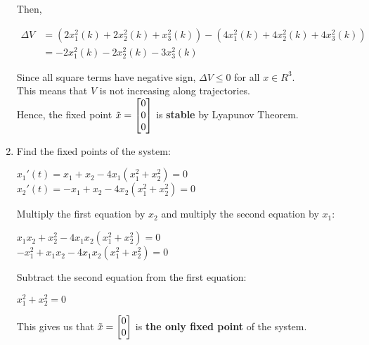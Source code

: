 \documentclass[12pt,a4paper, margin=1in]{article}
\begin{document}
\begin{enumerate}
        Then,

            \begin{center}
            \begin{equation*}
            \begin{split}
                    \Delta V & = (2x_1^2(k) + 2x_2^2(k) + x_3^2(k)) - (4x_1^2(k) + 4x_2^2(k) + 4x_3^2(k))\\
                    & = -2x_1^2(k) -2x_2^2(k) -3x_3^2(k)
            \end{split}
            \end{equation*}    
            \end{center}
        
            Since all square terms have negative sign, $\Delta V \leq 0$ for all $x \in R^3$.  \\

            This means that $V$ is not increasing along trajectories.  \\

            Hence, the fixed point $\Tilde{x} = \begin{bmatrix}
                0 \\ 0 \\ 0
            \end{bmatrix}$ is \textbf{stable} by Lyapunov Theorem. 

\newpage
    \item %
        Find the fixed points of the system: 
        \begin{center}
            $x_1'(t) = x_1 + x_2 -4x_1(x_1^2 + x_2^2) = 0$ \\
            $x_2'(t) = -x_1 + x_2 -4x_2(x_1^2 + x_2^2) = 0$ \\ 
        \end{center}
            Multiply the first equation by $x_2$ and multiply the second equation by $x_1$:
        \begin{center}
            $x_1x_2 + x_2^2 -4x_1x_2(x_1^2 + x_2^2) = 0$ \\
            $-x_1^2 + x_1x_2 -4x_1x_2(x_1^2 + x_2^2) = 0$
        \end{center}
        Subtract the second equation from the first equation:
        \begin{center}
            $x_1^2 + x_2^2 = 0$
        \end{center}
        This gives us that $\Tilde{x} = \begin{bmatrix}0 \\ 0 \end{bmatrix}$ is \textbf{the only fixed point} of the system. \\\\


\end{enumerate}
\end{document}

